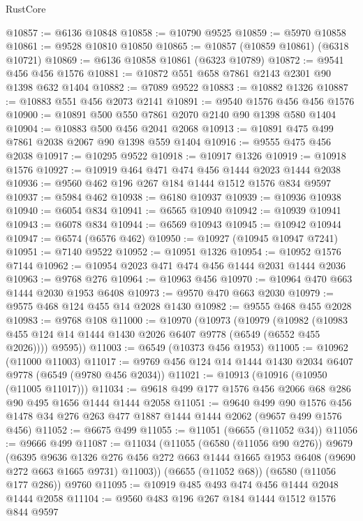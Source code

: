\begin{lexlean}{RustCore}
\begin{coremodule}
@10857 := @6136 @10848
@10858 := @10790 @9525
@10859 := @5970 @10858
@10861 := @9528 @10810 @10850
@10865 := @10857 (@10859 @10861) (@6318 @10721)
@10869 := @6136 @10858 @10861 (@6323 @10789)
@10872 := @9541 @456 @456 @1576
@10881 := @10872 @551 @658 @7861 @2143 @2301 @90 @1398 @632 @1404
@10882 := @7089 @9522
@10883 := @10882 @1326
@10887 := @10883 @551 @456 @2073 @2141
@10891 := @9540 @1576 @456 @456 @1576
@10900 := @10891 @500 @550 @7861 @2070 @2140 @90 @1398 @580 @1404
@10904 := @10883 @500 @456 @2041 @2068
@10913 := @10891 @475 @499 @7861 @2038 @2067 @90 @1398 @559 @1404
@10916 := @9555 @475 @456 @2038
@10917 := @10295 @9522
@10918 := @10917 @1326
@10919 := @10918 @1576
@10927 := @10919 @464 @471 @474 @456 @1444 @2023 @1444 @2038
@10936 := @9560 @462 @196 @267 @184 @1444 @1512 @1576 @834 @9597
@10937 := @5984 @462
@10938 := @6180 @10937
@10939 := @10936 @10938
@10940 := @6054 @834
@10941 := @6565 @10940
@10942 := @10939 @10941
@10943 := @6078 @834
@10944 := @6569 @10943
@10945 := @10942 @10944
@10947 := @6574 (@6576 @462)
@10950 := @10927 (@10945 @10947 @7241)
@10951 := @7140 @9522
@10952 := @10951 @1326
@10954 := @10952 @1576 @7144
@10962 := @10954 @2023 @471 @474 @456 @1444 @2031 @1444 @2036
@10963 := @9768 @276
@10964 := @10963 @456
@10970 := @10964 @470 @663 @1444 @2030 @1953 @6408
@10973 := @9570 @470 @663 @2030
@10979 := @9575 @468 @124 @455 @14 @2028 @1430
@10982 := @9555 @468 @455 @2028
@10983 := @9768 @108
@11000 := @10970
    (@10973
      (@10979
        (@10982 (@10983 @455 @124 @14 @1444 @1430 @2026 @6407 @9778 (@6549 (@6552 @455 @2026))))
        @9595))
@11003 := @6549 (@10373 @456 @1953)
@11005 := @10962 (@11000 @11003)
@11017 := @9769 @456 @124 @14 @1444 @1430 @2034 @6407 @9778 (@6549 (@9780 @456 @2034))
@11021 := @10913 (@10916 (@10950 (@11005 @11017)))
@11034 := @9618 @499 @177 @1576 @456 @2066 @68 @286 @90 @495 @1656 @1444 @1444 @2058
@11051 := @9640
    @499
    @90
    @1576
    @456
    @1478
    @34
    @276
    @263
    @477
    @1887
    @1444
    @1444
    @2062
    (@9657 @499 @1576 @456)
@11052 := @6675 @499
@11055 := @11051 (@6655 (@11052 @34))
@11056 := @9666 @499
@11087 := @11034
    (@11055
      (@6580 (@11056 @90 @276))
      @9679
      (@6395
        @9636
        @1326
        @276
        @456
        @272
        @663
        @1444
        @1665
        @1953
        @6408
        (@9690 @272 @663 @1665 @9731)
        @11003))
    (@6655 (@11052 @68))
    (@6580 (@11056 @177 @286))
    @9760
@11095 := @10919 @485 @493 @474 @456 @1444 @2048 @1444 @2058
@11104 := @9560 @483 @196 @267 @184 @1444 @1512 @1576 @844 @9597

\end{coremodule}
\end{lexlean}
